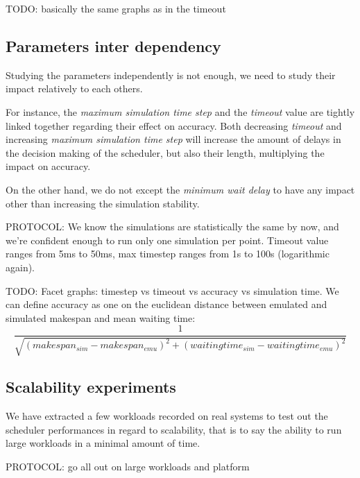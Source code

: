\documentclass[12pt, a4paper]{memoir}
\begin{document}
TODO: basically the same graphs as in the timeout

\subsection{Parameters inter dependency}

Studying the parameters independently is not enough, we need to study their
impact relatively to each others.

For instance, the \textit{maximum simulation time step} and the
\textit{timeout} value are tightly linked together regarding their effect on
accuracy. Both decreasing \textit{timeout} and increasing \textit{maximum
simulation time step} will increase the amount of delays in the decision making
of the scheduler, but also their length, multiplying the impact on accuracy.

On the other hand, we do not except the \textit{minimum wait delay} to have any
impact other than increasing the simulation stability.

PROTOCOL: We know the simulations are statistically the same by now, and we're
confident enough to run only one simulation per point. Timeout value ranges
from 5ms to 50ms, max timestep ranges from 1s to 100s (logarithmic again).

TODO: Facet graphs: timestep vs timeout vs accuracy vs simulation time. We can
define accuracy as one on the euclidean distance between emulated and simulated
makespan and mean waiting time: \[\frac{1}{\sqrt{(makespan_{sim} -
	makespan_{emu})^2 + (waitingtime_{sim} - waitingtime_{emu})^2}}\]

\subsection{Scalability experiments}

We have extracted a few workloads recorded on real systems to test out the
scheduler performances in regard to scalability, that is to say the ability to
run large workloads in a minimal amount of time.

PROTOCOL: go all out on large workloads and platform

\backmatter
\printbibliography
\end{document}
